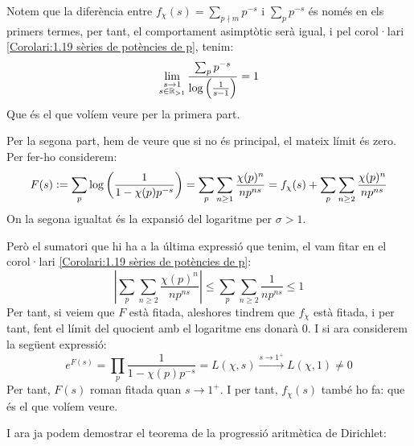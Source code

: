\begin{pf}
    Notem que la diferència entre $f_\chi(s)=\sum_{p\nmid m}p^{-s}$ i $\sum_pp^{-s}$ és només en els primers termes, per tant, el comportament asimptòtic serà igual, i pel corol·lari \ref{Corolari:1.19 sèries de potències de p}, tenim:
    \[
    \lim_{\substack{s\to 1\\s\in\mathbb R_{>1}}}\frac{\sum_{p}p^{-s}}{\log\left(\frac{1}{s-1}\right)}=1
    \]
    Que és el que volíem veure per la primera part.\par

    Per la segona part, hem de veure que si no és principal, el mateix límit és zero. Per fer-ho considerem:
    \[
    F(s)\vcentcolon=
    \sum_p\log\left(\frac{1}{1-\chi(p)p^{-s}}\right)=
    \sum_p\sum_{n\geq1}\frac{\chi(p)^n}{np^{ns}}=
    f_\chi(s)+\sum_p\sum_{n\geq2}\frac{\chi(p)^n}{np^{ns}}
    \]
    On la segona igualtat és la expansió del logaritme per $\sigma>1$.\par
    Però el sumatori que hi ha a la última expressió que tenim, el vam fitar en el corol·lari \ref{Corolari:1.19 sèries de potències de p}:
    \[
    \left|\sum_p\sum_{n\geq2}\frac{\chi(p)^n}{np^{ns}}\right|\leq
    \sum_p\sum_{n\geq2}\frac{1}{np^{ns}}\leq1
    \]
    Per tant, si veiem que $F$ està fitada, aleshores tindrem que $f_\chi$ està fitada, i per tant, fent el límit del quocient amb el logaritme ens donarà 0. I si ara considerem la següent expressió:
    \[
    e^{F(s)}=\prod_p\frac{1}{1-\chi(p)p^{-s}}=L(\chi,s)\xrightarrow{s\to1^+}L(\chi,1)\neq0
    \]
    Per tant, $F(s)$ roman fitada quan $s\to1^+$. I per tant, $f_\chi(s)$ també ho fa: que és el que volíem veure.
\end{pf}
I ara ja podem demostrar el teorema de la progressió aritmètica de Dirichlet:
